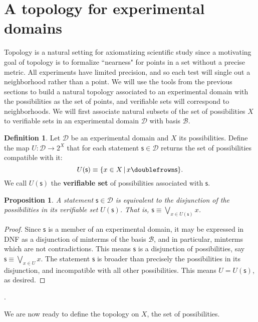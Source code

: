 \documentclass[psamsfonts]{amsart}
\newtheorem{prop}[thm]{Proposition}
\theoremstyle{definition}
\newtheorem{defn}[thm]{Definition}
\theoremstyle{remark}
\numberwithin{equation}{section}
\def\comp{\doublefrown}
\def\bigOR{\bigvee}
\newcommand{\stmt}[1][s] {\mathsf{#1}}
\newcommand{\obs}[1][s] {\mathsf{#1}}
\newcommand{\edomain}[1][D] {\mathcal{#1}}
\newcommand{\basis}[1][B] {\mathcal{#1}} %
\begin{document}
\section{A topology for experimental domains}

Topology is a natural setting for axiomatizing scientific study since a motivating goal of topology is to formalize ``nearness" for points in a set without a precise metric. All experiments have limited precision, and so each test will single out a neighborhood rather than a point. We will use the tools from the previous sections to build a natural topology associated to an experimental domain with the possibilities as the set of points, and verifiable sets will correspond to neighborhoods. We will first associate natural subsets of the set of possibilities $X$ to verifiable sets in an experimental domain $\edomain$ with basis $\basis$. 


\begin{defn}
	Let $\edomain$ be an experimental domain and $X$ its possibilities. Define the map $U : \edomain \rightarrow 2^X$ that for each statement $\obs \in \edomain$ returns the set of possibilities compatible with it: $$U(\obs)\equiv\{ x \in X \, | \, x \comp \obs\}.$$ We call $U(\obs)$ the \textbf{verifiable set} of possibilities associated with $\obs$.
\end{defn}

\begin{prop}
	A statement $\obs \in \edomain$ is equivalent to the disjunction of the possibilities in its verifiable set $U(\obs)$. That is, $\obs \equiv \bigOR\limits_{x \in U(\obs)} x$.
\end{prop}
\begin{proof}
Since $\stmt$ is a member of an experimental domain, it may be expressed in DNF as a disjunction of minterms of the basis $\basis$, and in particular, minterms which are not contradictions. This means $\stmt$ is a disjunction of possibilities, say $\stmt\equiv\bigOR\limits_{x \in U} x$. The statement $\stmt$ is broader than precisely the possibilities in its disjunction, and incompatible with all other possibilities. This means $U=U(\stmt)$, as desired. 
\end{proof}. 

We are now ready to define the topology on $X$, the set of possibilities. 
\end{document}
